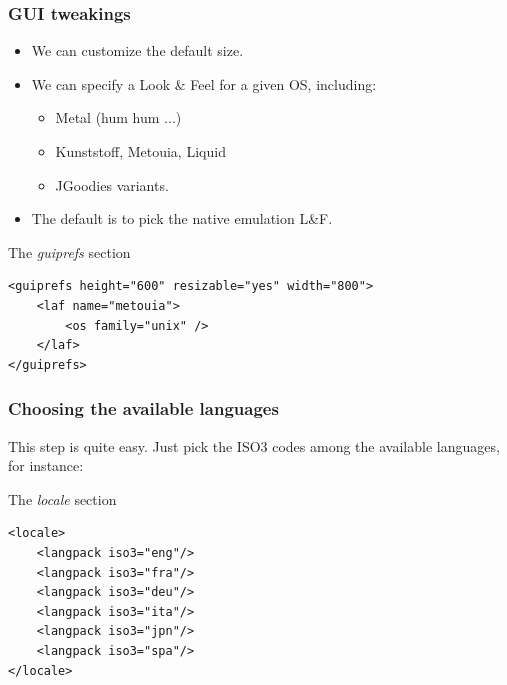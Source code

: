 \documentclass{beamer}
\begin{document}
\begin{frame}[containsverbatim]

\frametitle{GUI tweakings}

\begin{itemize}

  \item We can customize the default size.

  \item We can specify a Look \& Feel for a given OS, including:
    \begin{itemize}
      \item Metal (hum hum ...)
      \item Kunststoff, Metouia, Liquid
      \item JGoodies variants.
    \end{itemize}

  \item The default is to pick the native emulation L\&F.

\end{itemize}

\begin{block}{The \textsl{guiprefs} section}
\tiny
\begin{verbatim}
<guiprefs height="600" resizable="yes" width="800">
    <laf name="metouia">
        <os family="unix" />
    </laf>
</guiprefs>
\end{verbatim}
\end{block}

\end{frame}


\begin{frame}[containsverbatim]

\frametitle{Choosing the available languages}

This step is quite easy. Just pick the ISO3 codes among the available languages,
for instance:

\begin{block}{The \textsl{locale} section}
\tiny
\begin{verbatim}
<locale>
    <langpack iso3="eng"/>
    <langpack iso3="fra"/>
    <langpack iso3="deu"/>
    <langpack iso3="ita"/>
    <langpack iso3="jpn"/>
    <langpack iso3="spa"/>
</locale>
\end{verbatim}
\end{block}

\end{frame}
\end{document}
